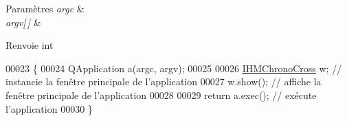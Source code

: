 \begin{DoxyParams}{Paramètres}
{\em argc} & \\
\hline
{\em argv\mbox{[}$\,$\mbox{]}} & \\
\hline
\end{DoxyParams}
\begin{DoxyReturn}{Renvoie}
int 
\end{DoxyReturn}

\begin{DoxyCode}
00023 \{
00024     QApplication a(argc, argv);
00025 
00026     \hyperlink{class_i_h_m_chrono_cross}{IHMChronoCross} w; \textcolor{comment}{// instancie la fenêtre principale de l'application}
00027     w.show(); \textcolor{comment}{// affiche la fenêtre principale de l'application}
00028 
00029     \textcolor{keywordflow}{return} a.exec(); \textcolor{comment}{// exécute l'application}
00030 \}
\end{DoxyCode}
